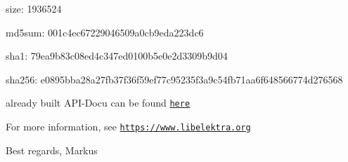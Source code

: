 \begin{DoxyItemize}
\item size\+: 1936524
\item md5sum\+: 001c4ec67229046509a0cb9eda223dc6
\item sha1\+: 79ea9b83c08ed4c347ed0100b5e0e2d3309b9d04
\item sha256\+: e0895bba28a27fb37f36f59ef77c95235f3a9c54fb71aa6f648566774d276568
\end{DoxyItemize}

already built A\+P\+I-\/\+Docu can be found \href{https://doc.libelektra.org/api/0.8.9/html/}{\tt here}

For more information, see \href{https://www.libelektra.org}{\tt https\+://www.\+libelektra.\+org}

Best regards, Markus 